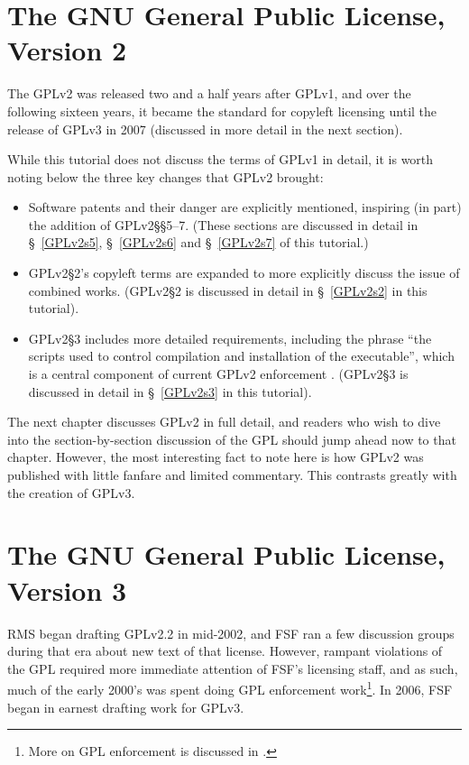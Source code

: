 \section{The GNU General Public License, Version 2}

The GPLv2 was released two and a half years after GPLv1, and over the
following sixteen years, it became the standard for copyleft licensing until
the release of GPLv3 in 2007 (discussed in more detail in the next section).

While this tutorial does not discuss the terms of GPLv1 in detail, it is
worth noting below the three key changes that GPLv2 brought:

\begin{itemize}

\item Software patents and their danger are explicitly mentioned, inspiring
  (in part) the addition of GPLv2\S\S5--7.  (These sections are discussed in
  detail in \S~\ref{GPLv2s5}, \S~\ref{GPLv2s6} and \S~\ref{GPLv2s7} of this
  tutorial.)

\item GPLv2\S2's copyleft terms are expanded to more explicitly discuss the
  issue of combined works.  (GPLv2\S2 is discussed in detail in
  \S~\ref{GPLv2s2} in this tutorial).

\item GPLv2\S3 includes more detailed requirements, including the phrase
 ``the scripts used to control compilation and installation of the
  executable'', which is a central component of current GPLv2 enforcement
  .  (GPLv2\S3 is discussed in detail in
  \S~\ref{GPLv2s3} in this tutorial).
\end{itemize}

The next chapter discusses GPLv2 in full detail, and readers who wish to dive
into the section-by-section discussion of the GPL should jump ahead now to
that chapter.  However, the most interesting fact to note here is how GPLv2
was published with little fanfare and limited commentary.  This contrasts
greatly with the creation of GPLv3.

\section{The GNU General Public License, Version 3}

RMS began drafting GPLv2.2 in mid-2002, and FSF ran a few discussion groups
during that era about new text of that license.  However, rampant violations
of the GPL required more immediate attention of FSF's licensing staff, and as
such, much of the early 2000's was spent doing GPL enforcement
work\footnote{More on GPL enforcement is discussed in .}.  In
2006, FSF began in earnest drafting work for GPLv3.

